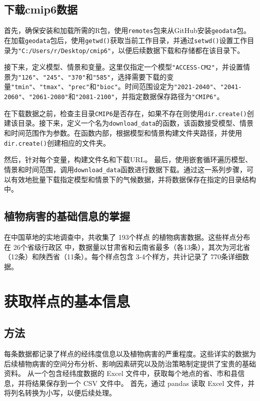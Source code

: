 \documentclass[AutoFakeBold]{LZUThesis-PgD&PhD}
\begin{document}
	
	\subsection{下载cmip6数据}
	首先，确保安装和加载所需的R包，使用\texttt{remotes}包来从GitHub安装\texttt{geodata}包。在加载\texttt{geodata}包后，使用\texttt{getwd()}获取当前工作目录，并通过\texttt{setwd()}设置工作目录为\texttt{"C:/Users/r/Desktop/cmip6"}，以便后续数据下载和存储都在该目录下。
	
	接下来，定义模型、情景和变量。这里仅指定一个模型\texttt{"ACCESS-CM2"}，并设置情景为\texttt{"126"}、\texttt{"245"}、\texttt{"370"}和\texttt{"585"}，选择需要下载的变量\texttt{"tmin"}、\texttt{"tmax"}、\texttt{"prec"}和\texttt{"bioc"}。时间范围设定为\texttt{"2021-2040"}、\texttt{"2041-2060"}、\texttt{"2061-2080"}和\texttt{"2081-2100"}，并指定数据保存路径为\texttt{"CMIP6"}。
	
	在下载数据之前，检查主目录\texttt{CMIP6}是否存在，如果不存在则使用\texttt{dir.create()}创建该目录。接下来，定义一个名为\texttt{download\_data}的函数，该函数接受模型、情景和时间范围作为参数。在函数内部，根据模型和情景构建文件夹路径，并使用\texttt{dir.create()}创建相应的文件夹。
	
	然后，针对每个变量，构建文件名和下载URL。
	最后，使用嵌套循环遍历模型、情景和时间范围，调用\texttt{download\_data}函数进行数据下载。通过这一系列步骤，可以有效地批量下载指定模型和情景下的气候数据，并将数据保存在指定的目录结构中。
	
	
	\subsection{植物病害的基础信息的掌握}
	在中国草地的实地调查中，共收集了 193个样点 的植物病害数据。这些样点分布在 26个省级行政区 中，数据量以甘肃省和云南省最多（各13条），其次为河北省（12条）和陕西省（11条）。每个样点包含 3-4个样方，共计记录了 770条详细数据。
	
	
	
	\section{获取样点的基本信息}
	
	\subsection{方法}
	每条数据都记录了样点的经纬度信息以及植物病害的严重程度。这些详实的数据为后续植物病害的空间分布分析、影响因素研究以及防治策略制定提供了宝贵的基础资料。
	从一个包含经纬度数据的 Excel 文件中，获取每个地点的省、市和县信息，并将结果保存到一个 CSV 文件中。
	首先，通过 pandas 读取 Excel 文件，并将列名转换为小写，以便后续处理。
	
\end{document}
